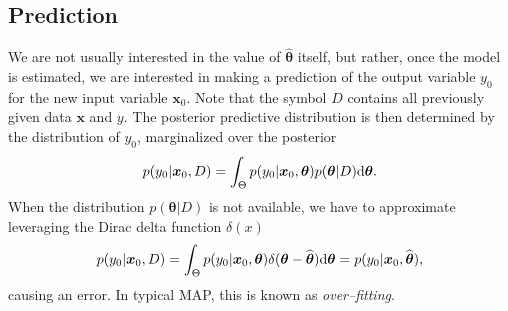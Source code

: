 \subsection{Prediction}
We are not usually interested in the value of $\widehat{\boldsymbol{\theta}}$ itself, but rather, once the model is estimated, we are interested in making a prediction of the output variable $y_0$ for the new input variable $\boldsymbol{x}_0$. Note that the symbol $D$ contains all previously given data $\boldsymbol{x}$ and $y$. The posterior predictive distribution is then determined by the distribution of $y_0$, marginalized over the posterior
\begin{equation}
	p(y_0 | \boldsymbol{x}_0, D) =   \int_{\Theta} p(y_0|\boldsymbol{x}_0, \boldsymbol{\theta}) p(\boldsymbol{\theta}|D) \mathrm{d}\boldsymbol{\theta}.
\end{equation} 
When the distribution $p(\boldsymbol{\theta}|D)$ is not available, we have to approximate leveraging the Dirac delta function $\delta(x)$  
\begin{equation}
p(y_0 | \boldsymbol{x}_0, D) = \int_{\Theta} 	p(y_0|\boldsymbol{x}_0, \boldsymbol{\theta}) \delta(\boldsymbol{\theta} - \widehat{\boldsymbol{\theta}})\mathrm{d}\boldsymbol{\theta} = p(y_0|\boldsymbol{x}_0, \widehat{\boldsymbol{\theta}}),
\end{equation}
causing an error. In typical MAP, this is known as \emph{over--fitting}. 

 
